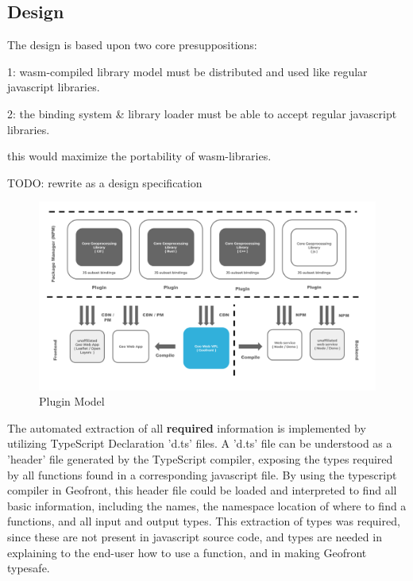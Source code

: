 \subsection{Design}

The design is based upon two core presuppositions:

1: wasm-compiled library model must be distributed and used like regular javascript libraries. 

2: the binding system \& library loader must be able to accept regular javascript libraries. 

this would maximize the portability of wasm-libraries.



\begin{note}
  TODO: rewrite as a design specification
\end{note}

\begin{figure}
  \centering
  \graphicspath{ {../../assets/diagrams/} }
  \includegraphics[width=\linewidth]{Model Proposal.png}
  \caption{Plugin Model}
  \label{fig:plugin-model}
\end{figure}

The automated extraction of all \textbf{required} information is implemented by utilizing TypeScript Declaration 'd.ts' files. 
A 'd.ts' file can be understood as a 'header' file generated by the TypeScript compiler, exposing the types required by all functions found in a corresponding javascript file.
By using the typescript compiler in Geofront, this header file could be loaded and interpreted to find all basic information, including the names, the namespace location of where to find a functions, and all input and output types.
This extraction of types was required, since these are not present in javascript source code, and types are needed in explaining to the end-user how to use a function, and in making Geofront typesafe.

